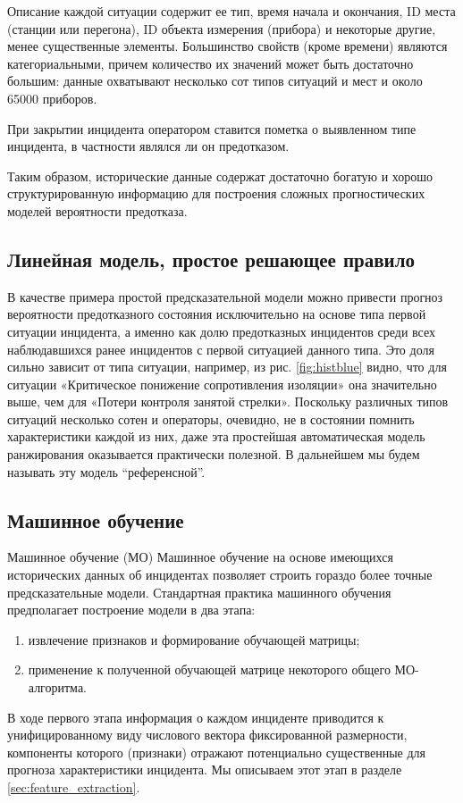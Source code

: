 Описание каждой ситуации содержит ее тип, время начала и окончания,
ID места (станции или перегона), ID объекта измерения (прибора) и некоторые другие, менее существенные элементы. Большинство свойств (кроме времени) являются категориальными, причем количество их значений может быть достаточно большим: данные охватывают несколько сот типов ситуаций и мест и около 65000 приборов.

При закрытии инцидента оператором ставится пометка о выявленном типе инцидента, в частности являлся ли он предотказом.

Таким образом, исторические данные содержат достаточно богатую и хорошо структурированную информацию для построения сложных прогностических моделей вероятности предотказа.

\subsection{Линейная модель, простое решающее правило}\label{sec:ref_model}

В качестве примера простой предсказательной модели можно привести прогноз вероятности предотказного состояния исключительно на основе типа первой ситуации инцидента, а именно как долю предотказных инцидентов среди всех наблюдавшихся ранее инцидентов с первой ситуацией данного типа. Это доля сильно зависит от типа ситуации, например, из рис. \ref{fig:histblue} видно, что для ситуации «Критическое понижение сопротивления изоляции» она значительно выше, чем для «Потери контроля занятой стрелки». Поскольку различных типов ситуаций несколько сотен и операторы, очевидно, не в состоянии помнить характеристики каждой из них, даже эта простейшая автоматическая модель ранжирования оказывается практически полезной. В дальнейшем мы будем называть эту модель ``референсной''.

\subsection{Машинное обучение}
Машинное обучение (МО) Машинное обучение на основе имеющихся исторических данных об инцидентах позволяет строить гораздо более точные предсказательные модели. Стандартная практика машинного обучения \cite{hastie01statisticallearning, Mitchell:1997:ML:541177, scikit-learn} предполагает построение модели в два этапа:
\begin{enumerate}
\item извлечение признаков и формирование обучающей матрицы;
\item применение к полученной обучающей матрице некоторого общего МО-алгоритма.
\end{enumerate}
В ходе первого этапа информация о каждом инциденте приводится к унифицированному виду числового вектора фиксированной размерности, компоненты которого (признаки) отражают потенциально существенные для прогноза характеристики инцидента. Мы описываем этот этап в разделе \ref{sec:feature_extraction}.

